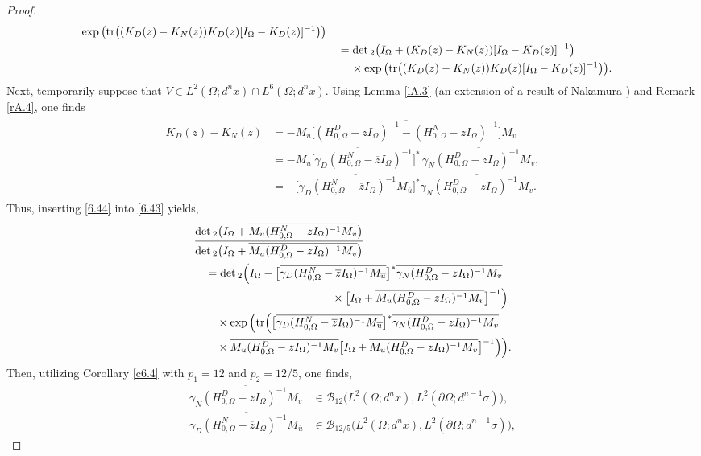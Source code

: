 \documentclass[reqno,10pt, centertags]{amsart}
\newcommand{\cB}{{\mathcal B}}
\newcommand{\no}{\nonumber}
\newcommand{\lb}{\label}
\newcommand{\ol}{\overline}
\newcommand{\ga}{\gamma}
\newcommand{\si}{\sigma}
\newcommand{\Om}{\Omega}
\newcommand{\dOm}{{\partial\Omega}}
\newcommand{\tr}{\text{\rm{tr}}}
\numberwithin{equation}{section}
\theoremstyle{definition}
\begin{document}
\begin{proof}
\begin{align}
\exp\big(\tr\big((K_D(z)-K_N(z))K_D(z)[I_{\Om}-K_D(z)]^{-1}\big)\big)
\no  \\
&\quad =
\det{}_2\big(I_{\Om}+(K_D(z)-K_N(z))[I_{\Om}-K_D(z)]^{-1}\big)
\lb{6.43}
\\
&\quad\quad \, \times
\exp\big(\tr\big((K_D(z)-K_N(z))K_D(z)[I_{\Om}-K_D(z)]^{-1}\big)\big).
\no
\end{align}
Next, temporarily suppose that $V\in L^2(\Om;d^nx)\cap
L^6(\Om;d^nx)$. Using Lemma \ref{lA.3} (an extension of a result of
Nakamura \cite[Lemma 6]{Na01}) and Remark \ref{rA.4}, one finds
\begin{align}
\begin{split}
K_D(z)-K_N(z) &=
-\ol{M_u\big[(H_{0,\Om}^D-zI_{\Om})^{-1}-(H_{0,\Om}^N
-zI_{\Om})^{-1}\big]M_v} \lb{6.44}
\\ &=
-\ol{M_u\big[\ga_D(H_{0,\Om}^N-\ol{z}I_{\Om})^{-1}\big]^*}\,
\ol{\ga_N(H_{0,\Om}^D -zI_{\Om})^{-1}M_v},
\\ &=
-\big[\ol{\ga_D(H_{0,\Om}^N-\ol{z}I_{\Om})^{-1}M_{\ol{u}}}\big]^*
\ol{\ga_N(H_{0,\Om}^D -zI_{\Om})^{-1}M_v}.
\end{split}
\end{align}
Thus, inserting \eqref{6.44} into \eqref{6.43} yields,
\begin{align}
&\frac{\det{}_2\big(I_{\Om}+\ol{M_u(H_{0,\Om}^N-zI_{\Om})^{-1}M_v}\big)}
{\det{}_2\big(I_{\Om}+\ol{M_u(H_{0,\Om}^D-zI_{\Om})^{-1}M_v}\big)}  \no
\\
&\quad = \det{}_2\Big(I_{\Om} - \big[\ol{\ga_D
(H_{0,\Om}^N-\ol{z}I_{\Om})^{-1}M_{\ol{u}}}\big]^*
\ol{\ga_N (H_{0,\Om}^D-zI_{\Om})^{-1}M_v}  \no \\
& \hspace*{4.3cm} \times
\big[I_{\Om}+\ol{M_u(H_{0,\Om}^D-zI_{\Om})^{-1}M_v}\big]^{-1}\Big)
\no \\
&\quad\quad \times \exp\Big(\tr\Big(\big[\ol{\ga_D
(H_{0,\Om}^N-\ol{z}I_{\Om})^{-1}M_{\ol{u}}}\big]^*
\ol{\ga_N(H_{0,\Om}^D-zI_{\Om})^{-1}M_v}  \lb{6.45}
\\
&\quad\quad \times
\ol{M_u(H_{0,\Om}^D-zI_{\Om})^{-1}M_v}\big[I_{\Om}+\ol{M_u(H_{0,\Om}^D
-zI_{\Om})^{-1}M_v}\big]^{-1}\Big)\Big).  \no
\end{align}
Then, utilizing Corollary \ref{c6.4} with $p_1=12$ and $p_2=12/5$,
one finds,
\begin{align}
\ol{\ga_N(H_{0,\Om}^D-zI_{\Om})^{-1}M_v}
&\in\cB_{12}\big(L^2(\Om;d^nx),L^2(\dOm;d^{n-1}\si)\big),
\\
\ol{\ga_D (H_{0,\Om}^N-\ol{z}I_{\Om})^{-1}M_{\ol{u}}}
&\in\cB_{12/5}\big(L^2(\Om;d^nx),L^2(\dOm;d^{n-1}\si)\big),

\end{align}
\end{proof}
\end{document}
